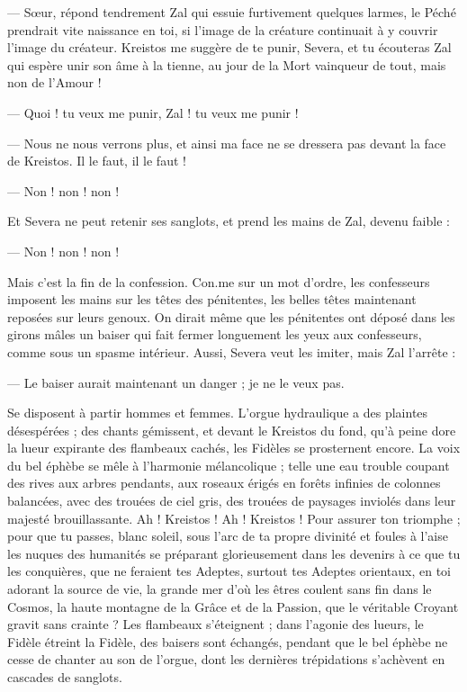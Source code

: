 \documentclass[a4paper, 11pt, oneside, polutonikogreek, french]{article}
\begin{document}
--- Sœur, répond tendrement Zal qui essuie furtivement quelques larmes, le Péché prendrait vite naissance en toi, si l'image de la créature continuait à y couvrir l'image du créateur. Kreistos me suggère de te punir, Severa, et tu écouteras Zal qui espère unir son âme à la tienne, au jour de la Mort vainqueur de tout, mais non de l'Amour !

--- Quoi ! tu veux me punir, Zal ! tu veux me punir !

--- Nous ne nous verrons plus, et ainsi ma face ne se dressera pas devant la face de Kreistos. Il le faut, il le faut !

--- Non ! non ! non !

Et Severa ne peut retenir ses sanglots, et prend les mains de Zal, devenu faible :

--- Non ! non ! non !

Mais c'est la fin de la confession. Con.me sur un mot d'ordre, les confesseurs imposent les mains sur les têtes des pénitentes, les belles têtes maintenant reposées sur leurs genoux. On dirait même que les pénitentes ont déposé dans les girons mâles un baiser qui fait fermer longuement les yeux aux confesseurs, comme sous un spasme intérieur. Aussi, Severa veut les imiter, mais Zal l'arrête :

--- Le baiser aurait maintenant un danger ; je ne le veux pas.

Se disposent à partir hommes et femmes. L'orgue hydraulique a des plaintes désespérées ; des chants gémissent, et devant le Kreistos du fond, qu'à peine dore la lueur expirante des flambeaux cachés, les Fidèles se prosternent encore. La voix du bel éphèbe se mêle à l'harmonie mélancolique ; telle une eau trouble coupant des rives aux arbres pendants, aux roseaux érigés en forêts infinies de colonnes balancées, avec des trouées de ciel gris, des trouées de paysages inviolés dans leur majesté brouillassante. Ah ! Kreistos ! Ah ! Kreistos ! Pour assurer ton triomphe ; pour que tu passes, blanc soleil, sous l'arc de ta propre divinité et foules à l'aise les nuques des humanités se préparant glorieusement dans les devenirs à ce que tu les conquières, que ne feraient tes Adeptes, surtout tes Adeptes orientaux, en toi adorant la source de vie, la grande mer d'où les êtres coulent sans fin dans le Cosmos, la haute montagne de la Grâce et de la Passion, que le véritable Croyant gravit sans crainte ? Les flambeaux s'éteignent ; dans l'agonie des lueurs, le Fidèle étreint la Fidèle, des baisers sont échangés, pendant que le bel éphèbe ne cesse de chanter au son de l'orgue, dont les dernières trépidations s'achèvent en cascades de sanglots.
\end{document}

